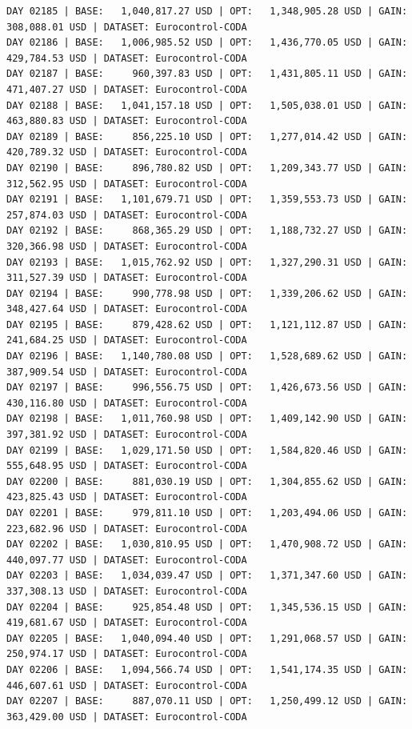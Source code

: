 \documentclass[11pt,a4paper]{article}
\begin{document}
\begin{verbatim}
DAY 02185 | BASE:   1,040,817.27 USD | OPT:   1,348,905.28 USD | GAIN: 308,088.01 USD | DATASET: Eurocontrol-CODA
DAY 02186 | BASE:   1,006,985.52 USD | OPT:   1,436,770.05 USD | GAIN: 429,784.53 USD | DATASET: Eurocontrol-CODA
DAY 02187 | BASE:     960,397.83 USD | OPT:   1,431,805.11 USD | GAIN: 471,407.27 USD | DATASET: Eurocontrol-CODA
DAY 02188 | BASE:   1,041,157.18 USD | OPT:   1,505,038.01 USD | GAIN: 463,880.83 USD | DATASET: Eurocontrol-CODA
DAY 02189 | BASE:     856,225.10 USD | OPT:   1,277,014.42 USD | GAIN: 420,789.32 USD | DATASET: Eurocontrol-CODA
DAY 02190 | BASE:     896,780.82 USD | OPT:   1,209,343.77 USD | GAIN: 312,562.95 USD | DATASET: Eurocontrol-CODA
DAY 02191 | BASE:   1,101,679.71 USD | OPT:   1,359,553.73 USD | GAIN: 257,874.03 USD | DATASET: Eurocontrol-CODA
DAY 02192 | BASE:     868,365.29 USD | OPT:   1,188,732.27 USD | GAIN: 320,366.98 USD | DATASET: Eurocontrol-CODA
DAY 02193 | BASE:   1,015,762.92 USD | OPT:   1,327,290.31 USD | GAIN: 311,527.39 USD | DATASET: Eurocontrol-CODA
DAY 02194 | BASE:     990,778.98 USD | OPT:   1,339,206.62 USD | GAIN: 348,427.64 USD | DATASET: Eurocontrol-CODA
DAY 02195 | BASE:     879,428.62 USD | OPT:   1,121,112.87 USD | GAIN: 241,684.25 USD | DATASET: Eurocontrol-CODA
DAY 02196 | BASE:   1,140,780.08 USD | OPT:   1,528,689.62 USD | GAIN: 387,909.54 USD | DATASET: Eurocontrol-CODA
DAY 02197 | BASE:     996,556.75 USD | OPT:   1,426,673.56 USD | GAIN: 430,116.80 USD | DATASET: Eurocontrol-CODA
DAY 02198 | BASE:   1,011,760.98 USD | OPT:   1,409,142.90 USD | GAIN: 397,381.92 USD | DATASET: Eurocontrol-CODA
DAY 02199 | BASE:   1,029,171.50 USD | OPT:   1,584,820.46 USD | GAIN: 555,648.95 USD | DATASET: Eurocontrol-CODA
DAY 02200 | BASE:     881,030.19 USD | OPT:   1,304,855.62 USD | GAIN: 423,825.43 USD | DATASET: Eurocontrol-CODA
DAY 02201 | BASE:     979,811.10 USD | OPT:   1,203,494.06 USD | GAIN: 223,682.96 USD | DATASET: Eurocontrol-CODA
DAY 02202 | BASE:   1,030,810.95 USD | OPT:   1,470,908.72 USD | GAIN: 440,097.77 USD | DATASET: Eurocontrol-CODA
DAY 02203 | BASE:   1,034,039.47 USD | OPT:   1,371,347.60 USD | GAIN: 337,308.13 USD | DATASET: Eurocontrol-CODA
DAY 02204 | BASE:     925,854.48 USD | OPT:   1,345,536.15 USD | GAIN: 419,681.67 USD | DATASET: Eurocontrol-CODA
DAY 02205 | BASE:   1,040,094.40 USD | OPT:   1,291,068.57 USD | GAIN: 250,974.17 USD | DATASET: Eurocontrol-CODA
DAY 02206 | BASE:   1,094,566.74 USD | OPT:   1,541,174.35 USD | GAIN: 446,607.61 USD | DATASET: Eurocontrol-CODA
DAY 02207 | BASE:     887,070.11 USD | OPT:   1,250,499.12 USD | GAIN: 363,429.00 USD | DATASET: Eurocontrol-CODA

\end{verbatim}
\end{document}
